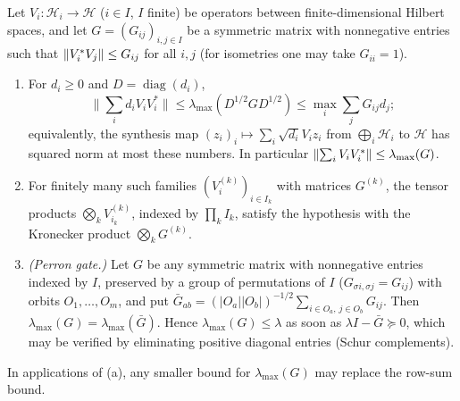 \begin{lemma}\label{lem:weighted-frame}
Let $V_i\colon\mathcal H_i\to\mathcal H$ ($i\in I$, $I$ finite) be operators
between finite-dimensional Hilbert spaces, and let $G=(G_{ij})_{i,j\in I}$ be a
symmetric matrix with nonnegative entries such that $\left\|V_i^*V_j\right\|\le G_{ij}$
for all $i,j$ (for isometries one may take $G_{ii}=1$).
\begin{enumerate}[label=\textup{(\alph*)}]
\item For $d_i\ge0$ and $D=\operatorname{diag}(d_i)$,
  \[
    \Big\|\sum_id_iV_iV_i^*\Big\|\le\lambda_{\max}(D^{1/2}GD^{1/2})
    \le\max_i\sum_jG_{ij}d_j ;
  \]
  equivalently, the synthesis map $(z_i)_i\mapsto\sum_i\sqrt{d_i}V_iz_i$ from
  $\bigoplus_i\mathcal H_i$ to $\mathcal H$ has squared norm at most these
  numbers. In particular $\left\|\sum_iV_iV_i^*\right\|\le\lambda_{\max}(G)$.
\item For finitely many such families $(V^{(k)}_i)_{i\in I_k}$ with matrices
  $G^{(k)}$, the tensor products $\bigotimes_kV^{(k)}_{i_k}$, indexed by
  $\prod_kI_k$, satisfy the hypothesis with the Kronecker product
  $\bigotimes_kG^{(k)}$.
\item \emph{(Perron gate.)} Let $G$ be any symmetric matrix with nonnegative
  entries indexed by $I$, preserved by a group of permutations of $I$
  ($G_{\sigma i,\sigma j}=G_{ij}$) with orbits $O_1,\dots,O_m$, and put
  $\bar G_{ab}=(|O_a||O_b|)^{-1/2}\sum_{i\in O_a,\,j\in O_b}G_{ij}$. Then
  $\lambda_{\max}(G)=\lambda_{\max}(\bar G)$. Hence $\lambda_{\max}(G)\le\lambda$
  as soon as $\lambda I-\bar G\succeq0$, which may be verified by eliminating
  positive diagonal entries (Schur complements).
\end{enumerate}
In applications of (a), any smaller bound for $\lambda_{\max}(G)$ may replace the row-sum bound.
\end{lemma}

